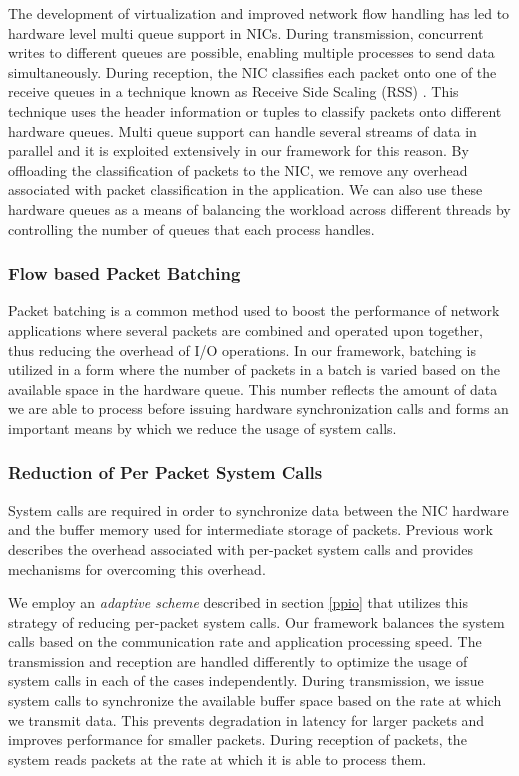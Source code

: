 \documentclass[conference]{IEEEtran}
\newcommand{\comment}[1]{}
\begin{document}
The development of virtualization and improved network flow handling has led to hardware level multi queue support in NICs. During transmission, concurrent writes to different queues are possible, enabling multiple processes to send data simultaneously. During reception, the NIC classifies each packet onto one of the receive queues in a technique known as Receive Side Scaling (RSS)\cite{micro2008} \cite{intel2010}. This technique uses the header information or tuples to classify packets onto different hardware queues. Multi queue support can handle several streams of data in parallel and it is exploited extensively in our framework for this reason. By offloading the classification of packets to the NIC, we remove any overhead associated with packet classification in the application. We can also use these hardware queues as a means of balancing the workload across different threads by controlling the number of queues that each process handles. \comment{Since different processes can access these transmit and receive queues, concurrent access to data is possible.}

\subsubsection{Flow based Packet Batching}

Packet batching is a common method used to boost the performance of network applications where several packets are combined and operated upon together, thus reducing the overhead of I/O operations. In our framework, batching is utilized in a form where the number of packets in a batch is varied based on the available space in the hardware queue. This number reflects the amount of data we are able to process before issuing hardware synchronization calls and forms an important means by which we reduce the usage of system calls.

\subsubsection{Reduction of Per Packet System Calls}

System calls are required in order to synchronize data between the NIC hardware and the buffer memory used for intermediate storage of packets. Previous work describes the overhead associated with per-packet system calls and provides mechanisms for overcoming this overhead\cite{1564468}\cite{Han:2010:PGS:1851275.1851207}\cite{Rizzo:2012:RNI:2090147.2103536}.

We employ an \textit{adaptive scheme} described in section \ref{ppio} that utilizes this strategy of reducing per-packet system calls. Our framework balances the system calls based on the communication rate and application processing speed. The transmission and reception are handled differently to optimize the usage of system calls in each of the cases independently. During transmission, we issue system calls to synchronize the available buffer space based on the rate at which we transmit data. This prevents degradation in latency for larger packets and improves performance for smaller packets. During reception of packets, the system reads packets at the rate at which it is able to process them.
\end{document}
